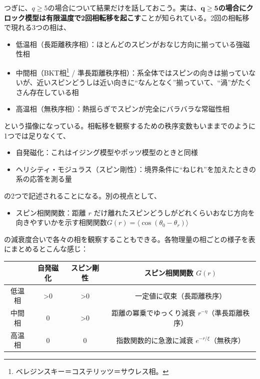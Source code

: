 \documentclass[paper=b5j,fontsize=12Q,jafontsize=12Q,baselineskip=21Q]{jlreq}
\begin{document}
\begin{refsection}
つぎに、$q\ge5$の場合について結果だけを話しておこう。実は、$\bm{q\ge5}$\textbf{の場合にクロック模型は有限温度で2回相転移を起こす}ことが知られている。2回の相転移で現れる3つの相は、
\begin{itemize}
  \item 低温相（長距離秩序相）：ほとんどのスピンがおなじ方向に揃っている強磁性相
  \item 中間相（BKT相\footnote{ベレジンスキー＝コステリッツ＝サウレス相。} / 準長距離秩序相）：系全体ではスピンの向きは揃っていないが、近いスピンどうしは近い向きに``なんとなく''揃っていて、``渦''がたくさん存在している相
  \item 高温相（無秩序相）：熱揺らぎでスピンが完全にバラバラな常磁性相
\end{itemize}
という描像になっている。相転移を観察するための秩序変数もいままでのように1つでは足りなくて、
\begin{itemize}
  \item 自発磁化：これはイジング模型やポッツ模型のときと同様
  \item ヘリシティ・モジュラス（スピン剛性）：境界条件に``ねじれ''を加えたときの系の応答を測る量
\end{itemize}
の2つで記述されることになる。別の視点として、
\begin{itemize}
  \item スピン相関関数：距離 $r$ だけ離れたスピンどうしがどれくらいおなじ方向を向きやすいかを示す相関関数$G(r) = \langle \cos(\theta_0 - \theta_r) \rangle$ 
\end{itemize}
の減衰度合いで各々の相を観察することもできる。各物理量の相ごとの様子を表にまとめるとこんな感じ：

\begin{center}
\begin{tabular}{c||c|c|c}
  \hline
   & 自発磁化 & スピン剛性 & スピン相関関数 $G(r)$ \\
  \hline\hline
  低温相 & >0 & >0 & 一定値に収束（長距離秩序） \\
  \hline
  中間相 & 0 & >0 & 距離の冪乗でゆっくり減衰 $r^{-\eta}$（準長距離秩序） \\
  \hline
  高温相 & 0 & 0 & 指数関数的に急激に減衰 $e^{-r/\xi}$（無秩序） \\
  \hline
\end{tabular}
\end{center}


\end{refsection}
\end{document}
